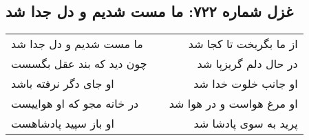 \begin{center}
\section*{غزل شماره ۷۲۲: ما مست شدیم و دل جدا شد}
\label{sec:0722}
\begin{longtable}{l p{0.5cm} r}
ما مست شدیم و دل جدا شد
&&
از ما بگریخت تا کجا شد
\\
چون دید که بند عقل بگسست
&&
در حال دلم گریزپا شد
\\
او جای دگر نرفته باشد
&&
او جانب خلوت خدا شد
\\
در خانه مجو که او هواییست
&&
او مرغ هواست و در هوا شد
\\
او باز سپید پادشاهست
&&
پرید به سوی پادشا شد
\\
\end{longtable}
\end{center}
